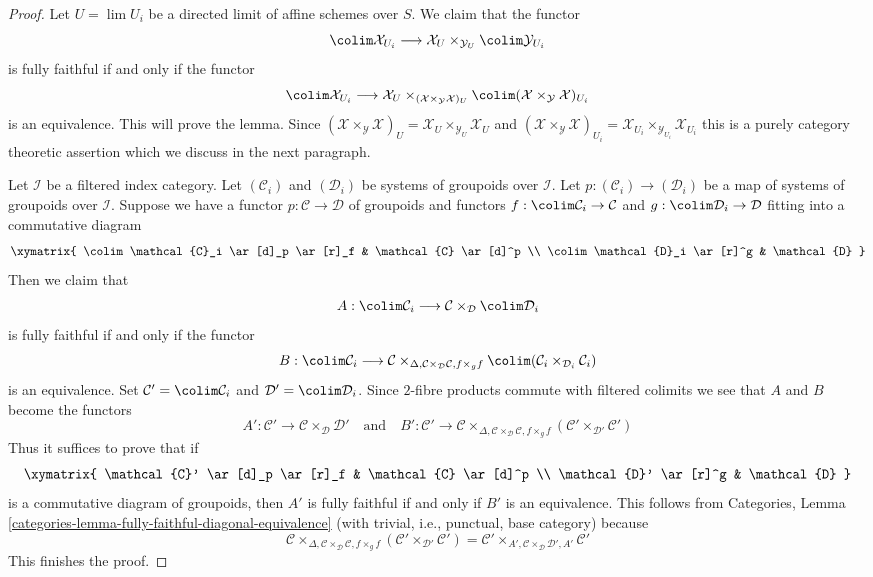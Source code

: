 \begin{proof}
Let $U = \lim U_i$ be a directed limit of affine schemes over $S$.
We claim that the functor
$$
\colim \mathcal{X}_{U_i} \longrightarrow
\mathcal{X}_U \times_{\mathcal{Y}_U} \colim \mathcal{Y}_{U_i}
$$
is fully faithful if and only if the functor
$$
\colim \mathcal{X}_{U_i} \longrightarrow
\mathcal{X}_U \times_{(\mathcal{X} \times_\mathcal{Y} \mathcal{X})_U}
\colim (\mathcal{X} \times_\mathcal{Y} \mathcal{X})_{U_i}
$$
is an equivalence. This will prove the lemma.
Since
$(\mathcal{X} \times_\mathcal{Y} \mathcal{X})_U =
\mathcal{X}_U \times_{\mathcal{Y}_U} \mathcal{X}_U$
and
$(\mathcal{X} \times_\mathcal{Y} \mathcal{X})_{U_i} =
\mathcal{X}_{U_i} \times_{\mathcal{Y}_{U_i}} \mathcal{X}_{U_i}$
this is a purely category theoretic assertion which we discuss
in the next paragraph.

\medskip\noindent
Let $\mathcal{I}$ be a filtered index category.
Let $(\mathcal{C}_i)$ and $(\mathcal{D}_i)$ be systems
of groupoids over $\mathcal{I}$.
Let $p : (\mathcal{C}_i) \to (\mathcal{D}_i)$ be a map
of systems of groupoids over $\mathcal{I}$.
Suppose we have a functor $p : \mathcal{C} \to \mathcal{D}$
of groupoids and functors
$f : \colim \mathcal{C}_i \to \mathcal{C}$ and
$g : \colim \mathcal{D}_i \to \mathcal{D}$
fitting into a commutative diagram
$$
\xymatrix{
\colim \mathcal{C}_i \ar[d]_p \ar[r]_f & \mathcal{C} \ar[d]^p \\
\colim \mathcal{D}_i \ar[r]^g & \mathcal{D}
}
$$
Then we claim that
$$
A : \colim \mathcal{C}_i \longrightarrow
\mathcal{C} \times_\mathcal{D} \colim \mathcal{D}_i
$$
is fully faithful if and only if the functor
$$
B : \colim \mathcal{C}_i \longrightarrow
\mathcal{C}
\times_{\Delta, \mathcal{C} \times_\mathcal{D} \mathcal{C}, f \times_g f}
\colim (\mathcal{C}_i \times_{\mathcal{D}_i} \mathcal{C}_i)
$$
is an equivalence. Set $\mathcal{C}' = \colim \mathcal{C}_i$ and
$\mathcal{D}' = \colim \mathcal{D}_i$.
Since $2$-fibre products commute with filtered colimits we see that
$A$ and $B$ become the functors
$$
A' : \mathcal{C}' \to \mathcal{C} \times_\mathcal{D} \mathcal{D}'
\quad\text{and}\quad
B' : \mathcal{C}' \longrightarrow
\mathcal{C}
\times_{\Delta, \mathcal{C} \times_\mathcal{D} \mathcal{C}, f \times_g f}
(\mathcal{C}' \times_{\mathcal{D}'} \mathcal{C}')
$$
Thus it suffices to prove that if
$$
\xymatrix{
\mathcal{C}' \ar[d]_p \ar[r]_f & \mathcal{C} \ar[d]^p \\
\mathcal{D}' \ar[r]^g & \mathcal{D}
}
$$
is a commutative diagram of groupoids, then $A'$ is fully faithful
if and only if $B'$ is an equivalence. This follows from
Categories, Lemma \ref{categories-lemma-fully-faithful-diagonal-equivalence}
(with trivial, i.e., punctual, base category) because
$$
\mathcal{C}
\times_{\Delta, \mathcal{C} \times_\mathcal{D} \mathcal{C}, f \times_g f}
(\mathcal{C}' \times_{\mathcal{D}'} \mathcal{C}') =
\mathcal{C}'
\times_{A', \mathcal{C} \times_\mathcal{D} \mathcal{D}', A'}
\mathcal{C}'
$$
This finishes the proof.
\end{proof}

